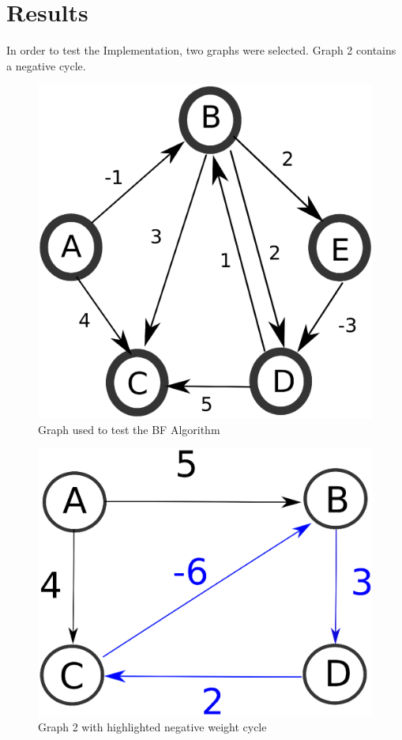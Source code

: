 \documentclass[12pt]{article}
\begin{document}
\section{Results}
In order to test the Implementation, two graphs were selected. Graph 2 contains a negative cycle. 
\begin{figure}[h]
\centering
	\includegraphics[scale=0.25]{./Figures/w1Graph1.eps} 
	\caption{Graph used to test the BF Algorithm}
	\label{fig:g1}
\end{figure}

\begin{figure}[h]
\centering
	\includegraphics[scale=0.25]{./Figures/w1Graph2.eps} 
	\caption{Graph 2 with highlighted negative weight cycle}
	\label{fig:g2}
\end{figure}
\end{document}
